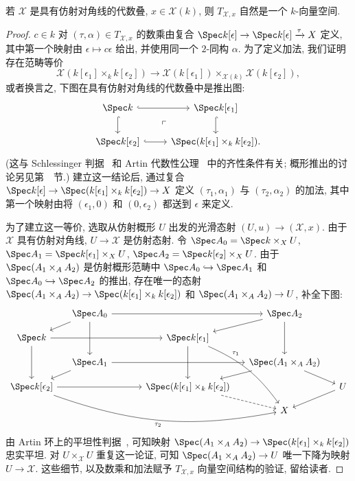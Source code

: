 \begin{proposition}\label{src:4.5.10}
若 $\mathcal X$ 是具有仿射对角线的代数叠, $x\in\mathcal X(k)$, 则 $T_{\mathcal X,x}$ 自然是一个 $k$-向量空间.
\end{proposition}
\begin{proof}
$c\in k$ 对 $(\tau,\alpha)\in T_{\mathcal X,x}$ 的数乘由复合 $\Spec k[\epsilon]\to\Spec k[\epsilon]\xrightarrow{\tau}\mathcal X$ 定义, 其中第一个映射由 $\epsilon\mapsto c\epsilon$ 给出, 并使用同一个 $2$-同构 $\alpha$. 为了定义加法, 我们证明存在范畴等价
\[
\mathcal X(k[\epsilon_1]\times_k k[\epsilon_2])\longrightarrow\mathcal X(k[\epsilon_1])\times_{\mathcal X(k)}\mathcal X(k[\epsilon_2]),
\]
或者换言之, 下图在具有仿射对角线的代数叠中是推出图:
\[
\begin{tikzcd}
\Spec k\arrow[r,hook]\arrow[d,hook]\arrow[dr,phantom,"\ulcorner" description]&\Spec k[\epsilon_1]\arrow[d,hook]\\
\Spec k[\epsilon_2]\arrow[r,hook]&\Spec(k[\epsilon_1]\times_k k[\epsilon_2]).
\end{tikzcd}
\]
(这与 Schlessinger 判据~ 和 Artin 代数性公理~ 中的齐性条件有关; 概形推出的讨论另见第~~节.) 建立这一结论后, 通过复合 $\Spec k[\epsilon]\to\Spec(k[\epsilon_1]\times_k k[\epsilon_2])\to\mathcal X$ 定义 $(\tau_1,\alpha_1)$ 与 $(\tau_2,\alpha_2)$ 的加法, 其中第一个映射由将 $(\epsilon_1,0)$ 和 $(0,\epsilon_2)$ 都送到 $\epsilon$ 来定义.

为了建立这一等价, 选取从仿射概形 $U$ 出发的光滑态射 $(U,u)\to(\mathcal X,x)$. 由于 $\mathcal X$ 具有仿射对角线, $U\to\mathcal X$ 是仿射态射. 令 $\Spec A_0=\Spec k\times_{\mathcal X}U$, $\Spec A_1=\Spec k[\epsilon_1]\times_{\mathcal X}U$, $\Spec A_2=\Spec k[\epsilon_2]\times_{\mathcal X}U$. 由于 $\Spec(A_1\times_A A_2)$ 是仿射概形范畴中 $\Spec A_0\hookrightarrow\Spec A_1$ 和 $\Spec A_0\hookrightarrow\Spec A_2$ 的推出, 存在唯一的态射 $\Spec(A_1\times_A A_2)\to\Spec(k[\epsilon_1]\times_k k[\epsilon_2])$ 和 $\Spec(A_1\times_A A_2)\to U$, 补全下图:
\[
\begin{tikzcd}[column sep=small,row sep=small]
{}&\Spec A_0\arrow[rrr]\arrow[dd]\arrow[dl]&{}&{}&\Spec A_2\arrow[dd]\arrow[dl]&{}\\
\Spec k\arrow[rrr]\arrow[dd]&{}&{}&\Spec k[\epsilon_1]\arrow[dd]\arrow[dddr,bend left=15,"\tau_1" near start]&{}&{}\\
{}&\Spec A_1\arrow[rrr]\arrow[dl]&{}&{}&\Spec(A_1\times_A A_2)\arrow[dl]\arrow[dr]&{}\\
\Spec k[\epsilon_2]\arrow[rrr]\arrow[drrrr,bend right=15,"\tau_2"']&{}&{}&\Spec(k[\epsilon_1]\times_k k[\epsilon_2])\arrow[dr,dashed]&{}&U\arrow[dl]\\
{}&{}&{}&{}&\mathcal X&{}
\end{tikzcd}
\]
由 Artin 环上的平坦性判据~, 可知映射 $\Spec(A_1\times_A A_2)\to\Spec(k[\epsilon_1]\times_k k[\epsilon_2])$ 忠实平坦. 对 $U\times_{\mathcal X}U$ 重复这一论证, 可知 $\Spec(A_1\times_A A_2)\to U$ 唯一下降为映射 $U\to\mathcal X$. 这些细节, 以及数乘和加法赋予 $T_{\mathcal X,x}$ 向量空间结构的验证, 留给读者.
\end{proof}
